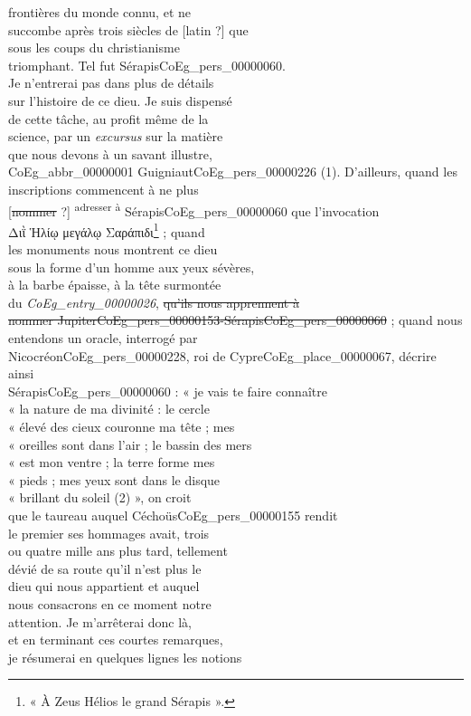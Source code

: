 \documentclass{book}
\begin{document}
{\begin{paracol}{2}
frontières du monde connu, et ne\\
succombe après trois siècles de [latin ?] que\\
sous les coups du christianisme\\
triomphant. Tel fut Sérapis\gls{CoEg_pers_00000060}.\\
\noindent Je n’entrerai pas dans plus de détails\\
sur l’histoire de ce dieu. Je suis dispensé\\
de cette tâche, au profit même de la\\
science, par un \textit{excursus} sur la matière\\
que nous devons à un savant illustre,\\
\gls{CoEg_abbr_00000001} Guigniaut\gls{CoEg_pers_00000226} (1). D’ailleurs, quand les\\
inscriptions commencent à ne plus\\
{[\sout{nommer} ?]} \textsuperscript{adresser à} Sérapis\gls{CoEg_pers_00000060} que l’invocation\\
Διῒ Ἡλίῳ μεγάλῳ Σαράπιδι\footnote{« À Zeus Hélios le grand Sérapis ».} ; quand\\
les monuments nous montrent ce dieu\\
sous la forme d’un homme aux yeux sévères,\\
à la barbe épaisse, à la tête surmontée\\
du \textit{\gls{CoEg_entry_00000026}}, \sout{qu’ils nous apprennent à\\
nommer Jupiter\gls{CoEg_pers_00000153}-Sérapis\gls{CoEg_pers_00000060}} ; quand nous\\
entendons un oracle, interrogé par\\
Nicocréon\gls{CoEg_pers_00000228}, roi de Cypre\gls{CoEg_place_00000067}, décrire ainsi\\
Sérapis\gls{CoEg_pers_00000060} : « je vais te faire connaître\\
« la nature de ma divinité : le cercle\\
« élevé des cieux couronne ma tête ; mes\\
« oreilles sont dans l’air ; le bassin des mers\\
« est mon ventre ; la terre forme mes\\
« pieds ; mes yeux sont dans le disque\\
« brillant du soleil (2) », on croit\\
que le taureau auquel Céchoüs\gls{CoEg_pers_00000155} rendit\\
le premier ses hommages avait, trois\\
ou quatre mille ans plus tard, tellement\\
dévié de sa route qu’il n’est plus le\\
dieu qui nous appartient et auquel\\
nous consacrons en ce moment notre\\
attention. Je m’arrêterai donc là,\\
et en terminant ces courtes remarques,\\
je résumerai en quelques lignes les notions
\end{paracol}

}
\end{document}
